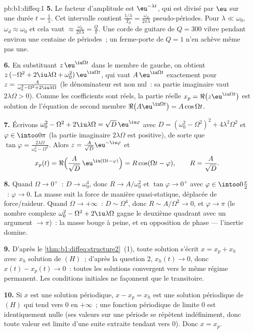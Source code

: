 \begin{solution}{pb:b1:diffeq:1}
\textbf{5.} Le facteur d'amplitude est $\eu^{-\lambda t}$, qui est
divisé par $\eu$ sur une durée $t = \frac1\lambda$. Cet intervalle
contient $\frac{1/\lambda}{T_d} = \frac{\omega_d}{2\pi\lambda}$
pseudo-périodes. Pour $\lambda \ll \omega_0$, $\omega_d \approx
\omega_0$ et cela vaut $\approx \frac{\omega_0}{2\pi\lambda} =
\frac Q\pi$. Une corde de guitare de $Q = 300$ vibre pendant environ
une centaine de périodes~; un ferme-porte de $Q = 1$ n'en achève même
pas une.

\textbf{6.} En substituant $z\,\eu^{\iu\Omega t}$ dans le membre de
gauche, on obtient $z\,(-\Omega^2 + 2\iu\lambda\Omega +
\omega_0^2)\,\eu^{\iu\Omega t}$, qui vaut $A\,\eu^{\iu\Omega t}$
exactement pour $z = \frac{A}{\omega_0^2 - \Omega^2 +
2\iu\lambda\Omega}$ (le dénominateur est non nul~: sa partie
imaginaire vaut $2\lambda\Omega > 0$). Comme les coefficients sont
réels, la partie réelle $x_p = \Re\bigl(z\eu^{\iu\Omega t}\bigr)$ est
solution de l'équation de second membre $\Re\bigl(A\eu^{\iu\Omega
t}\bigr) = A\cos\Omega t$.

\textbf{7.} Écrivons $\omega_0^2 - \Omega^2 + 2\iu\lambda\Omega =
\sqrt{D}\,\eu^{\iu\varphi}$ avec $D = (\omega_0^2 - \Omega^2)^2 +
4\lambda^2\Omega^2$ et $\varphi \in \intoo0\pi$ (la partie imaginaire
$2\lambda\Omega$ est positive), de sorte que $\tan\varphi =
\frac{2\lambda\Omega}{\omega_0^2 - \Omega^2}$. Alors $z =
\frac{A}{\sqrt D}\eu^{-\iu\varphi}$ et
\[
x_p(t) = \Re\Bigl(\frac A{\sqrt D}\,\eu^{\iu(\Omega t -
\varphi)}\Bigr) = R\cos(\Omega t - \varphi),
\qquad R = \frac A{\sqrt D} .
\]

\textbf{8.} Quand $\Omega \to 0^+$~: $D \to \omega_0^4$, donc $R \to
A/\omega_0^2$ et $\tan\varphi \to 0^+$ avec $\varphi \in
\intoo0{\frac\pi2}$~: $\varphi \to 0$. La masse suit la force de
manière quasi-statique, déplacée de force/raideur. Quand $\Omega \to
+\infty$~: $D \sim \Omega^4$, donc $R \sim A/\Omega^2 \to 0$, et
$\varphi \to \pi$ (le nombre complexe $\omega_0^2 - \Omega^2 +
2\iu\lambda\Omega$ gagne le deuxième quadrant avec un argument $\to
\pi$)~: la masse bouge à peine, et en opposition de phase --- l'inertie
domine.

\textbf{9.} D'après le \cref{thm:b1:diffeq:structure2}~(1), toute
solution s'écrit $x = x_p + x_h$ avec $x_h$ solution de $(H)$~;
d'après la question 2, $x_h(t) \to 0$, donc $x(t) - x_p(t) \to 0$~:
toutes les solutions convergent vers le même régime permanent. Les
conditions initiales ne façonnent que le transitoire.

\textbf{10.} Si $x$ est une solution périodique, $x - x_p = x_h$ est
une solution périodique de $(H)$ qui tend vers $0$ en $+\infty$~; une
fonction périodique de limite $0$ est identiquement nulle (ses valeurs
sur une période se répètent indéfiniment, donc toute valeur est limite
d'une suite extraite tendant vers $0$). Donc $x = x_p$.


\end{solution}
